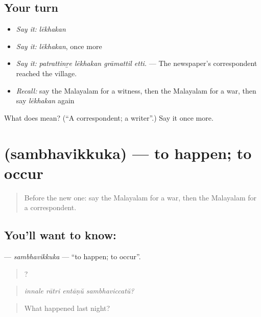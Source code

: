 \subsection*{Your turn}
\begin{itemize}
\raggedright
  \item \emph{Say it:} \emph{lēkhakan}
  \item \emph{Say it:} \emph{lēkhakan}, once more
  \item \emph{Say it:} \emph{patrattinṟe lēkhakan grāmattil etti.} — The newspaper's correspondent reached the village.
  \item \emph{Recall:} say the Malayalam for a witness, then the Malayalam for a war, then say \emph{lēkhakan} again
\end{itemize}

\begin{tcolorbox}[breakable,colback=teal!4,colframe=teal!35!black,title={Before you move on}]
What does  mean? (\textquotedblleft{}A correspondent; a writer\textquotedblright{}.) Say it once more.
\end{tcolorbox}
\section[\texorpdfstring{\ml{സംഭവിക്കുക} (sambhavikkuka)}{സംഭവിക്കുക (sambhavikkuka)}]{ (sambhavikkuka) — to happen; to occur}

\label{lesson:ML-C349-sambhavikkuka}



\begin{quote}
Before the new one: say the Malayalam for a war, then the Malayalam for a correspondent.
\end{quote}

\subsection*{You'll want to know: }
\textbf{} — \emph{sambhavikkuka} — \textquotedblleft{}to happen; to occur\textquotedblright{}.

\begin{quote}
   ?
\end{quote}

\begin{quote}
\emph{innale rātri entāṇŭ sambhaviccatŭ?}
\end{quote}

\begin{quote}
What happened last night?
\end{quote}

